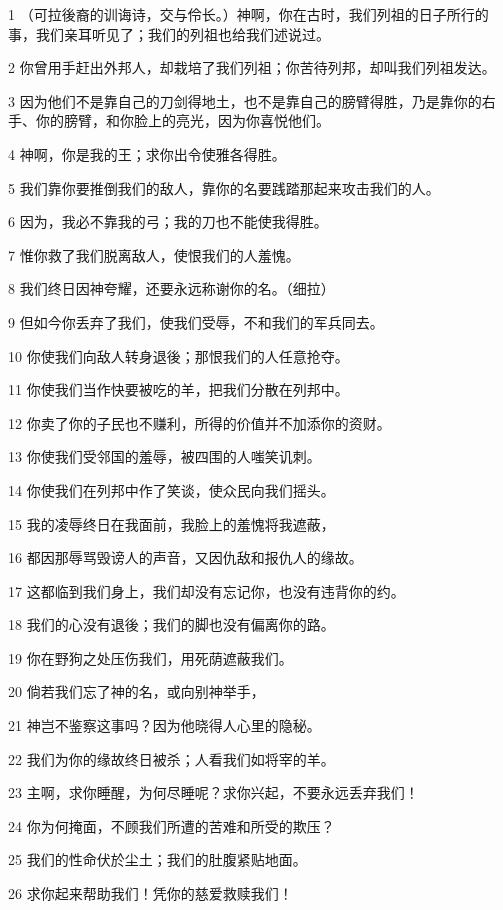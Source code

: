 \par 1 （可拉後裔的训诲诗，交与伶长。）神啊，你在古时，我们列祖的日子所行的事，我们亲耳听见了；我们的列祖也给我们述说过。
\par 2 你曾用手赶出外邦人，却栽培了我们列祖；你苦待列邦，却叫我们列祖发达。
\par 3 因为他们不是靠自己的刀剑得地土，也不是靠自己的膀臂得胜，乃是靠你的右手、你的膀臂，和你脸上的亮光，因为你喜悦他们。
\par 4 神啊，你是我的王；求你出令使雅各得胜。
\par 5 我们靠你要推倒我们的敌人，靠你的名要践踏那起来攻击我们的人。
\par 6 因为，我必不靠我的弓；我的刀也不能使我得胜。
\par 7 惟你救了我们脱离敌人，使恨我们的人羞愧。
\par 8 我们终日因神夸耀，还要永远称谢你的名。（细拉）
\par 9 但如今你丢弃了我们，使我们受辱，不和我们的军兵同去。
\par 10 你使我们向敌人转身退後；那恨我们的人任意抢夺。
\par 11 你使我们当作快要被吃的羊，把我们分散在列邦中。
\par 12 你卖了你的子民也不赚利，所得的价值并不加添你的资财。
\par 13 你使我们受邻国的羞辱，被四围的人嗤笑讥刺。
\par 14 你使我们在列邦中作了笑谈，使众民向我们摇头。
\par 15 我的凌辱终日在我面前，我脸上的羞愧将我遮蔽，
\par 16 都因那辱骂毁谤人的声音，又因仇敌和报仇人的缘故。
\par 17 这都临到我们身上，我们却没有忘记你，也没有违背你的约。
\par 18 我们的心没有退後；我们的脚也没有偏离你的路。
\par 19 你在野狗之处压伤我们，用死荫遮蔽我们。
\par 20 倘若我们忘了神的名，或向别神举手，
\par 21 神岂不鉴察这事吗？因为他晓得人心里的隐秘。
\par 22 我们为你的缘故终日被杀；人看我们如将宰的羊。
\par 23 主啊，求你睡醒，为何尽睡呢？求你兴起，不要永远丢弃我们！
\par 24 你为何掩面，不顾我们所遭的苦难和所受的欺压？
\par 25 我们的性命伏於尘土；我们的肚腹紧贴地面。
\par 26 求你起来帮助我们！凭你的慈爱救赎我们！

